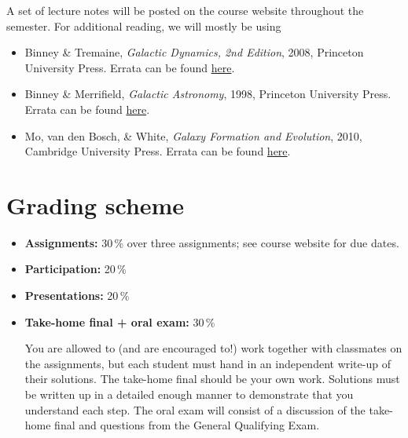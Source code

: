 \documentclass{article}
\begin{document}
A set of lecture notes will be posted on the course website throughout the semester. For additional reading, we will mostly be using

\begin{itemize}

  \item Binney \& Tremaine, \emph{Galactic Dynamics, 2nd Edition},
    2008, Princeton University Press. Errata can be found
    \href{https://www-thphys.physics.ox.ac.uk/people/JamesBinney/web/index\_files/BT2errors.pdf}{here}.

  \item Binney \& Merrifield, \emph{Galactic Astronomy},
    1998, Princeton University Press. Errata can be found
    \href{http://www-thphys.physics.ox.ac.uk/people/JamesBinney/bmerrors.pdf}{here}.

  \item Mo, van den Bosch, \& White, \emph{Galaxy Formation and Evolution},
    2010, Cambridge University Press. Errata can be found
    \href{http://people.umass.edu/hjmo/book/errata.pdf}{here}.

\end{itemize}

\section*{Grading scheme}

\begin{itemize}

  \item {\bf Assignments:} 30\,\% over three assignments; see course website for due dates.

  \item {\bf Participation:} 20\,\%

  \item {\bf Presentations:} 20\,\%

  \item {\bf Take-home final + oral exam:} 30\,\%

You are allowed to (and are encouraged to!) work together with
classmates on the assignments, but each student must hand in an
independent write-up of their solutions. The take-home final should be
your own work. Solutions must be written up in a detailed enough
manner to demonstrate that you understand each step. The oral exam
will consist of a discussion of the take-home final and questions from
the General Qualifying Exam.

\end{itemize}
\end{document}
